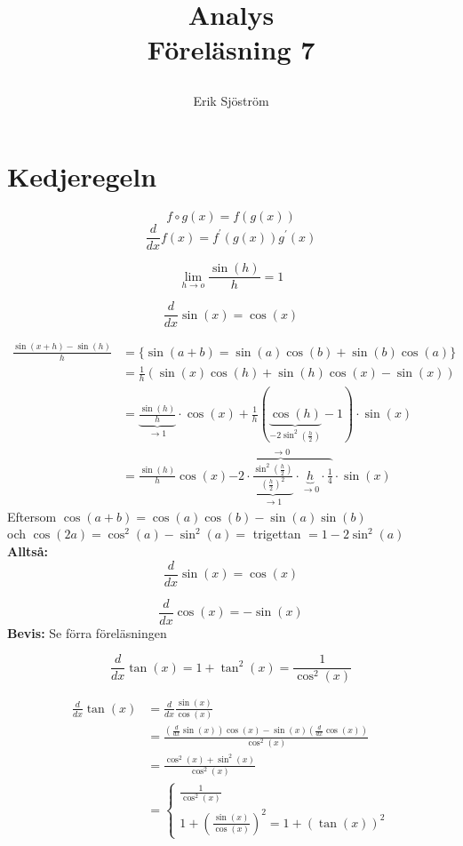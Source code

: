

\title{
     Analys\\
     Föreläsning 7
    \author{Erik Sjöström}
}

\maketitle

\section{Kedjeregeln} %
\label{sec:kedjeregeln}
\[
f \circ g(x) = f(g(x))
\]
\[
\frac{d}{dx}f(x) = f^\prime(g(x))g^\prime(x)
\]
\begin{sats}
    \[
    \lim\limits_{h \to o}\frac{\sin(h)}{h}=1
    \]
\end{sats}
\begin{sats}
    \[
    \frac{d}{dx}\sin(x) = \cos(x)
    \]
\end{sats}
\begin{bevis}
	\begin{align*}
		\frac{\sin(x + h)-\sin(h)}{h} &= \{\sin(a + b) = \sin(a)\cos(b) + \sin(b)\cos(a)\}\\
		&= \frac{1}{h}(\sin(x)\cos(h) + \sin(h)\cos(x) - \sin(x))\\
		&= \underbrace{\frac{\sin(h)}{h}}_{\to 1} \cdot \cos(x) + \frac{1}{h}(\underbrace{\cos(h)}_{-2\sin^2(\frac{h}{2})} - 1) \cdot \sin(x) \\
		&= \frac{\sin(h)}{h}\cos(x) \overbrace{- 2 \cdot \underbrace{\frac{\sin^2(\frac{h}{2})}{(\frac{h}{2})^2}}_{\to 1} \cdot \underbrace{h}_{\to 0} \cdot \frac{1}{4}}^{\to 0} \cdot \sin(x)
	\end{align*}
	Eftersom $\cos(a + b) = \cos(a)\cos(b) - \sin(a)\sin(b)$\\
	och $\cos(2a) = \cos^2(a) - \sin^2(a) = $ {trigettan} $= 1 - 2\sin^2(a)$\\
	\textbf{Alltså:} \[
	\frac{d}{dx}\sin(x) = \cos(x)
	\]
\end{bevis}
\begin{sats}
    \[
    \frac{d}{dx}\cos(x) = -\sin(x)
    \]
    \textbf{Bevis:} Se förra föreläsningen
\end{sats}
\begin{sats}
    \[
    \frac{d}{dx}\tan(x) = 1 + \tan^2(x) = \frac{1}{\cos^2(x)}
    \]
\end{sats}
\begin{bevis}
	\begin{align*}
		\frac{d}{dx}\tan(x) &= \frac{d}{dx}\frac{\sin(x)}{\cos(x)}\\
		&= \frac{(\frac{d}{dx}\sin(x))\cos(x) - \sin(x)(\frac{d}{dx}\cos(x))}{\cos^2(x)} \\
		&= \frac{\cos^2(x) + \sin^2(x)}{\cos^2(x)} \\
		&= \begin{cases}
			\frac{1}{\cos^2(x)}\\
			1 + (\frac{\sin(x)}{\cos(x)})^2 = 1 + (\tan(x))^2
		\end{cases}\\
	\end{align*}
\end{bevis}
